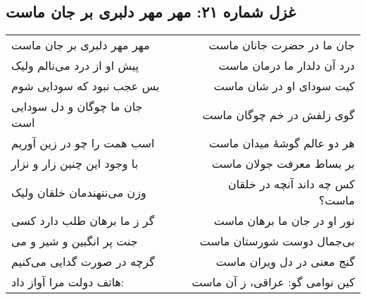 \begin{center}
\section*{غزل شماره ۲۱: مهر مهر دلبری بر جان ماست}
\label{sec:021}
\begin{longtable}{l p{0.5cm} r}
مهر مهر دلبری بر جان ماست
&&
جان ما در حضرت جانان ماست
\\
پیش او از درد می‌نالم ولیک
&&
درد آن دلدار ما درمان ماست
\\
بس عجب نبود که سودایی شوم
&&
کیت سودای او در شان ماست
\\
جان ما چوگان و دل سودایی است
&&
گوی زلفش در خم چوگان ماست
\\
اسب همت را چو در زین آوریم
&&
هر دو عالم گوشهٔ میدان ماست
\\
با وجود این چنین زار و نزار
&&
بر بساط معرفت جولان ماست
\\
وزن می‌ننهندمان خلقان ولیک
&&
کس چه داند آنچه در خلقان ماست؟
\\
گر ز ما برهان طلب دارد کسی
&&
نور او در جان ما برهان ماست
\\
جنت پر انگبین و شیر و می
&&
بی‌جمال دوست شورستان ماست
\\
گرچه در صورت گدایی می‌کنیم
&&
گنج معنی در دل ویران ماست
\\
هاتف دولت مرا آواز داد:
&&
کین نوامی گو: عراقی، ز آن ماست
\\
\end{longtable}
\end{center}
